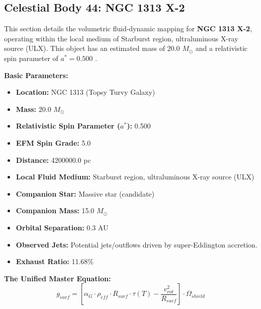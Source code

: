 \documentclass[11pt, a4paper]{article}
\begin{document}
\clearpage
\subsection{Celestial Body 44: NGC 1313 X-2}
This section details the volumetric fluid-dynamic mapping for \textbf{NGC 1313 X-2}, operating within the local medium of Starburst region, ultraluminous X-ray source (ULX). This object has an estimated mass of 20.0 $M_{\odot}$ and a relativistic spin parameter of $a^* = 0.500$ \cite{liu2012, ned}.

\vspace{0.5em}
\noindent \textbf{Basic Parameters:}
\begin{itemize}
  \item \textbf{Location:} NGC 1313 (Topsy Turvy Galaxy)
  \item \textbf{Mass:} 20.0 $M_{\odot}$
  \item \textbf{Relativistic Spin Parameter ($a^*$):} 0.500
  \item \textbf{EFM Spin Grade:} 5.0
  \item \textbf{Distance:} 4200000.0 pc
  \item \textbf{Local Fluid Medium:} Starburst region, ultraluminous X-ray source (ULX)
  \item \textbf{Companion Star:} Massive star (candidate)
  \item \textbf{Companion Mass:} 15.0 $M_{\odot}$
  \item \textbf{Orbital Separation:} 0.3 AU
  \item \textbf{Observed Jets:} Potential jets/outflows driven by super-Eddington accretion.
  \item \textbf{Exhaust Ratio:} 11.68\%
\end{itemize}

\vspace{0.5em}
\noindent \textbf{The Unified Master Equation:}
$$ g_{surf} = \left[ \alpha_G \cdot \rho_{eff} \cdot R_{surf} \cdot \tau(T) - \frac{v_{rot}^2}{R_{surf}} \right] \cdot \Omega_{shield} $$
\end{document}
